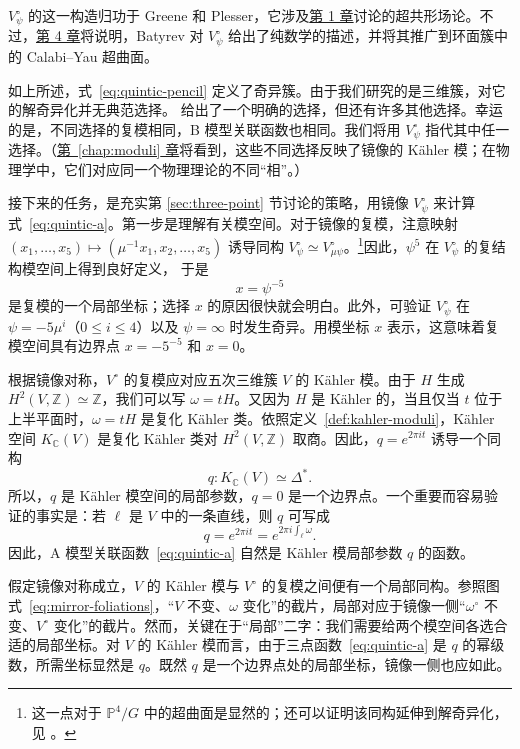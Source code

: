 $V_\psi^\circ$ 的这一构造归功于 Greene 和 Plesser，它涉及\hyperref[chap:introduction]{第 1 章}讨论的超共形场论。不过，\hyperref[chap:mirror-constructions]{第 4 章}将说明，Batyrev 对 $V_\psi^\circ$ 给出了纯数学的描述，并将其推广到环面簇中的 Calabi--Yau 超曲面。

如上所述，式~\eqref{eq:quintic-pencil} 定义了奇异簇。由于我们研究的是三维簇，对它的解奇异化并无典范选择。 给出了一个明确的选择，但还有许多其他选择。幸运的是，不同选择的复模相同，B 模型关联函数也相同。我们将用 $V_\psi^\circ$ 指代其中任一选择。（\hyperref[chap:moduli]{第~\ref*{chap:moduli} 章}将看到，这些不同选择反映了镜像的 Kähler 模；在物理学中，它们对应同一个物理理论的不同“相”。）

接下来的任务，是充实第 \ref{sec:three-point} 节讨论的策略，用镜像 $V_\psi^\circ$ 来计算式~\eqref{eq:quintic-a}。第一步是理解有关模空间。对于镜像的复模，注意映射 $(x_1,\ldots,x_5)\mapsto(\mu^{-1}x_1,x_2,\ldots,x_5)$ 诱导同构 $V_\psi^\circ\simeq V_{\mu\psi}^\circ$。\footnote{这一点对于 $\mathbb P^4/G$ 中的超曲面是显然的；还可以证明该同构延伸到解奇异化，见 。}因此，$\psi^5$ 在 $V_\psi^\circ$ 的复结构模空间上得到良好定义，
于是
\[
x=\psi^{-5}
\]
是复模的一个局部坐标；选择 $x$ 的原因很快就会明白。此外，可验证 $V_\psi^\circ$ 在 $\psi=-5\mu^i$（$0\leq i\leq4$）以及 $\psi=\infty$ 时发生奇异。用模坐标 $x$ 表示，这意味着复模空间具有边界点 $x=-5^{-5}$ 和 $x=0$。

根据镜像对称，$V^\circ$ 的复模应对应五次三维簇 $V$ 的 Kähler 模。由于 $H$ 生成 $H^2(V,\mathbb Z)\simeq\mathbb Z$，我们可以写 $\omega=tH$。又因为 $H$ 是 Kähler 的，当且仅当 $t$ 位于上半平面时，$\omega=tH$ 是复化 Kähler 类。依照定义~\ref{def:kahler-moduli}，Kähler 空间 $K_{\mathbb C}(V)$ 是复化 Kähler 类对 $H^2(V,\mathbb Z)$ 取商。因此，$q=e^{2\pi it}$ 诱导一个同构
\[
q:K_{\mathbb C}(V)\simeq\Delta^*.
\]
所以，$q$ 是 Kähler 模空间的局部参数，$q=0$ 是一个边界点。一个重要而容易验证的事实是：若 $\ell$ 是 $V$ 中的一条直线，则 $q$ 可写成
\begin{equation}\label{eq:q-kahler}
q=e^{2\pi it}=e^{2\pi i\int_\ell\omega}.
\end{equation}
因此，A 模型关联函数~\eqref{eq:quintic-a} 自然是 Kähler 模局部参数 $q$ 的函数。

假定镜像对称成立，$V$ 的 Kähler 模与 $V^\circ$ 的复模之间便有一个局部同构。参照图式~\eqref{eq:mirror-foliations}，“$V$ 不变、$\omega$ 变化”的截片，局部对应于镜像一侧“$\omega^\circ$ 不变、$V^\circ$ 变化”的截片。然而，关键在于“局部”二字：我们需要给两个模空间各选合适的局部坐标。对 $V$ 的 Kähler 模而言，由于三点函数~\eqref{eq:quintic-a} 是 $q$ 的幂级数，所需坐标显然是 $q$。既然 $q$ 是一个边界点处的局部坐标，镜像一侧也应如此。

